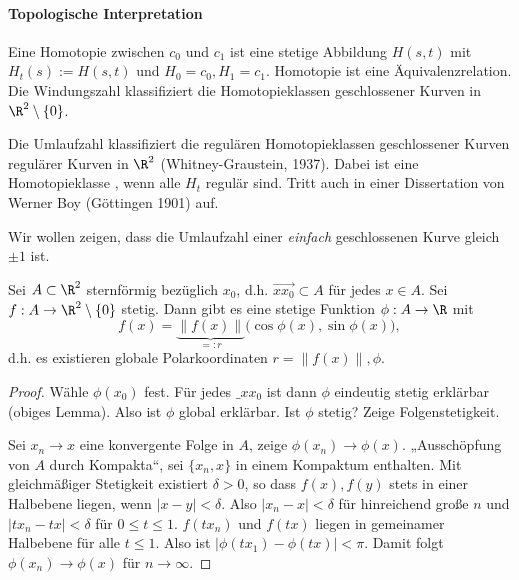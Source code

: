 \paragraph{Topologische Interpretation}

Eine Homotopie zwischen $c_0$ und $c_1$ ist eine stetige Abbildung $H(s, t)$ mit $H_t(s) := H(s, t)$ und $H_0 = c_0, H_1 = c_1$.
Homotopie ist eine Äquivalenzrelation.
Die Windungszahl klassifiziert die Homotopieklassen geschlossener Kurven in $\R^2 \setminus \{0\}$.

Die Umlaufzahl klassifiziert die regulären Homotopieklassen geschlossener Kurven regulärer Kurven in $\R^2$ (Whitney-Graustein, 1937).
Dabei ist eine Homotopieklasse , wenn alle $H_t$ regulär sind.
Tritt auch in einer Dissertation von Werner Boy (Göttingen 1901) auf.

Wir wollen zeigen, dass die Umlaufzahl einer \emph{einfach} geschlossenen Kurve gleich $\pm 1$ ist.

\begin{lem}
	Sei $A \subset \R^2$ sternförmig bezüglich $x_0$, d.h. $\vec{xx_0} \subset A$ für jedes $x \in A$.
	Sei $f: A \to \R^2 \setminus \{0\}$ stetig.
	Dann gibt es eine stetige Funktion $\phi: A \to \R$ mit
	\[
		f(x) = \underbrace{\|f(x)\|}_{=:r} \big( \cos \phi(x), \sin \phi(x) \big),
	\]
	d.h. es existieren globale Polarkoordinaten $r = \|f(x)\|, \phi$.
	\begin{proof}
		Wähle $\phi(x_0)$ fest.
		Für jedes $\_{xx_0}$ ist dann $\phi$ eindeutig stetig erklärbar (obiges Lemma).
		Also ist $\phi$ global erklärbar.
		Ist $\phi$ stetig?
		Zeige Folgenstetigkeit.

		Sei $x_n \to x$ eine konvergente Folge in $A$, zeige $\phi(x_n) \to \phi(x)$.
		„Ausschöpfung von $A$ durch Kompakta“, \oBdA sei $\{x_n, x\}$ in einem Kompaktum enthalten.
		Mit gleichmäßiger Stetigkeit existiert $\delta > 0$, so dass $f(x), f(y)$ stets in einer Halbebene liegen, wenn $|x-y| < \delta$.
		Also $|x_n - x| < \delta$ für hinreichend große $n$ und $|tx_n - tx| < \delta$ für $0 \le t \le 1$.
		$f(tx_n)$ und $f(tx)$ liegen in gemeinamer Halbebene für alle $t \le 1$.
		Also ist $|\phi(tx_1) - \phi(tx)| < \pi$.
		Damit folgt $\phi(x_n) \to \phi(x)$ für $n \to \infty$.
	\end{proof}
\end{lem}

